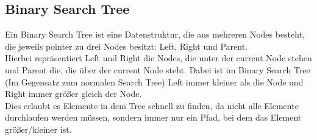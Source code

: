 \documentclass[
../../AuD-Zusammenfassung.tex,
]
{subfiles}
\begin{document}
\subsection{Binary Search Tree}
Ein Binary Search Tree ist eine Datenstruktur, die aus mehreren Nodes besteht, die jeweils pointer zu drei Nodes besitzt: Left, Right und Parent. \\
Hierbei repräsentiert Left und Right die Nodes, die unter der current Node stehen und Parent die, die über der current Node steht. Dabei ist im Binary Search Tree (Im Gegensatz zum normalen Search Tree) Left immer kleiner als die Node und Right immer größer gleich der Node. \\
Dies erlaubt es Elemente in dem Tree schnell zu finden, da nicht alle Elemente durchlaufen werden müssen, sondern immer nur ein Pfad, bei dem das Element größer/kleiner ist. \\


\begin{minipage}[t]{0.5\textwidth}
    \centering
\end{minipage}
\end{document}
